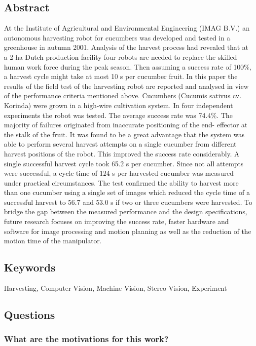 \subsection*{Abstract}
At the Institute of Agricultural and Environmental Engineering (IMAG B.V.) an autonomous harvesting
robot for cucumbers was developed and tested in a greenhouse in autumn 2001. Analysis of the harvest
process had revealed that at a 2 ha Dutch production facility four robots are needed to replace the skilled
human work force during the peak season. Then assuming a success rate of 100\%, a harvest cycle might take
at most 10 s per cucumber fruit. In this paper the results of the field test of the harvesting robot are reported
and analysed in view of the performance criteria mentioned above. Cucumbers (Cucumis sativus cv. Korinda)
were grown in a high-wire cultivation system. In four independent experiments the robot was tested. The
average success rate was 74.4\%. The majority of failures originated from inaccurate positioning of the end-
effector at the stalk of the fruit. It was found to be a great advantage that the system was able to perform
several harvest attempts on a single cucumber from different harvest positions of the robot. This improved the
success rate considerably. A single successful harvest cycle took 65.2 s per cucumber. Since not all attempts
were successful, a cycle time of 124 s per harvested cucumber was measured under practical circumstances. The
test confirmed the ability to harvest more than one cucumber using a single set of images which reduced the
cycle time of a successful harvest to 56.7 and 53.0 s if two or three cucumbers were harvested. To bridge the
gap between the measured performance and the design specifications, future research focuses on improving the
success rate, faster hardware and software for image processing and motion planning as well as the reduction
of the motion time of the manipulator.


\subsection*{Keywords} Harvesting, Computer Vision, Machine Vision, Stereo Vision, Experiment

\subsection*{Questions}
\subsubsection*{What are the motivations for this work?}

